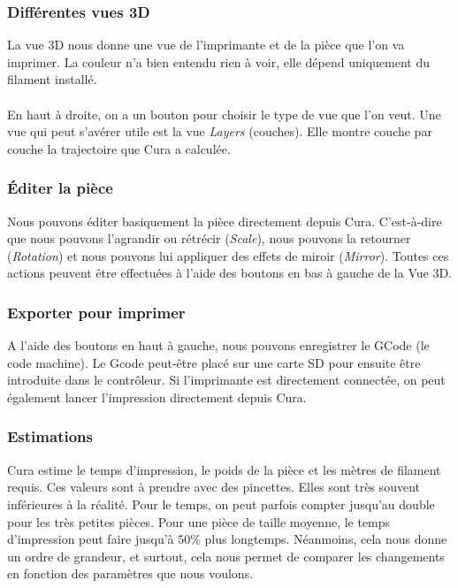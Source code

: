 \subsubsection{Différentes vues 3D}
La vue 3D nous donne une vue de l'imprimante et de la pièce que l'on va imprimer. La couleur n'a bien entendu rien à voir, elle dépend uniquement du filament installé.

\paragraph{} En haut à droite, on a un bouton pour choisir le type de vue que l'on veut. Une vue qui peut s'avérer utile est la vue \emph{Layers} (couches). Elle montre couche par couche la trajectoire que Cura a calculée.


\subsubsection{Éditer la pièce}

Nous pouvons éditer basiquement la pièce directement depuis Cura. C'est-à-dire que nous pouvons l'agrandir ou rétrécir (\emph{Scale}), nous pouvons la retourner (\emph{Rotation}) et nous pouvons lui appliquer des effets de miroir (\emph{Mirror}). Toutes ces actions peuvent être effectuées à l'aide des boutons en bas à gauche de la Vue 3D.

\subsubsection{Exporter pour imprimer}

A l'aide des boutons en haut à gauche, nous pouvons enregistrer le GCode (le code machine). Le Gcode peut-être placé sur une carte SD pour ensuite être introduite dans le contrôleur. Si l'imprimante est directement connectée, on peut également lancer l'impression directement depuis Cura.

\subsubsection{Estimations}

Cura estime le temps d'impression, le poids de la pièce et les mètres de filament requis. Ces valeurs sont à prendre avec des pincettes. Elles sont très souvent inférieures à la réalité. Pour le temps, on peut parfois compter jusqu'au double pour les très petites pièces. Pour une pièce de taille moyenne, le temps d'impression peut faire jusqu'à $50\%$ plus longtemps. Néanmoins, cela nous donne un ordre de grandeur, et surtout, cela nous permet de comparer les changements en fonction des paramètres que nous voulons. 

























